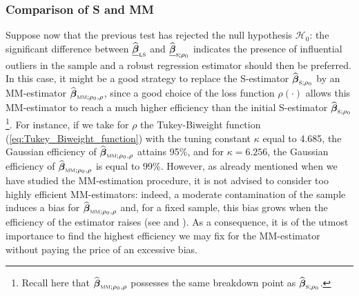 \subsubsection{Comparison of S and MM}

Suppose now that the previous test has rejected the null hypothesis
$\mathcal{H}_{0}$: the significant difference between $\sthat{\underline
{\boldsymbol\beta}}_{\stsc{LS}}$ and $\sthat{\underline
{\boldsymbol\beta}}_{\stsc{S};\rho_{0}}$ indicates the presence of
influential outliers in the sample and a robust regression estimator should
then be preferred. In this case, it might be a good strategy to replace the
S-estimator $\sthat{\boldsymbol\beta}_{\stsc{S};\rho_{0}}$ by an
MM-estimator $\sthat{\boldsymbol\beta}_{\stsc{MM};\rho_{0},\rho}$, since
a good choice of the loss function $\rho\left(  \cdot\right)  $ allows this
MM-estimator to reach a much higher efficiency than the initial S-estimator
$\sthat{\boldsymbol\beta}_{\stsc{S};\rho_{0}}$\footnote{Recall here that
$\sthat{\boldsymbol\beta}_{\stsc{MM};\rho_{0},\rho}$ possesses the same
breakdown point as $\sthat{\boldsymbol\beta}_{\stsc{S};\rho_{0}}$.}. For
instance, if we take for $\rho$ the Tukey-Biweight function
(\ref{eq:Tukey_Biweight_function}) with the tuning constant $\kappa$ equal to
4.685, the Gaussian efficiency of $\sthat{\boldsymbol\beta}_{\stsc{MM}%
;\rho_{0},\rho}$ attains 95\%, and for $\kappa=6.256$, the Gaussian efficiency
of $\sthat{\boldsymbol\beta}_{\stsc{MM};\rho_{0},\rho}$ is equal to
99\%. However, as already mentioned when we have studied the MM-estimation
procedure, it is not advised to consider too highly efficient MM-estimators:
indeed, a moderate contamination of the sample induces a bias for
$\sthat{\boldsymbol\beta}_{\stsc{MM};\rho_{0},\rho}$ and, for a fixed
sample, this bias grows when the efficiency of the estimator raises (see
\citealp{maronna:etal:2006} and \citealp{Omelka:2010}).
As a consequence, it is of the utmost importance to find the highest
efficiency we may fix for the MM-estimator without paying the price of an
excessive bias.

